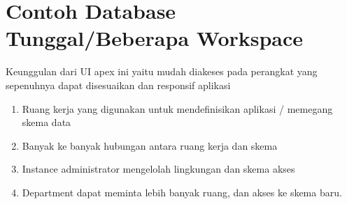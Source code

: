 \section{Contoh Database Tunggal/Beberapa Workspace}
    Keunggulan dari UI apex ini yaitu mudah diakeses pada perangkat yang sepenuhnya dapat disesuaikan dan responsif aplikasi
    \begin{enumerate}
    \item Ruang kerja yang digunakan untuk mendefinisikan aplikasi / memegang skema data
    \item Banyak ke banyak hubungan antara ruang kerja dan skema
    \item Instance administrator mengelolah lingkungan dan skema akses
    \item Department dapat meminta lebih banyak ruang, dan akses ke skema baru.
    \end{enumerate}
